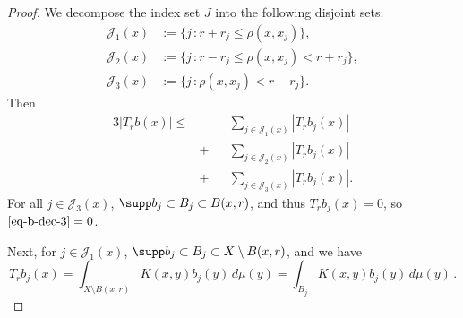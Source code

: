 \begin{proof}
We decompose the index set $J$ into the following disjoint sets:
\begin{align*}
    \mathcal{J}_1(x)&:=\{j\,: r+r_j \le \rho(x,x_j) \},\\
    \mathcal{J}_2(x)&:=\{j\,: r-r_j \le \rho(x,x_j) < r+r_j\},\\
    \mathcal{J}_3(x)&:=\{j\,: \rho(x,x_j) < r-r_j\}.
\end{align*}
Then
\begin{alignat}{3}
    \label{eq-b-dec-1}
    |T_r b(x)|\le&&&\sum_{j\in \mathcal{J}_1(x)} |T_rb_j(x)| \\
    \label{eq-b-dec-2}
                &+&&\sum_{j\in \mathcal{J}_2(x)} |T_rb_j(x)| \\
    \label{eq-b-dec-3}
                &+&&\sum_{j\in \mathcal{J}_3(x)} |T_rb_j(x)|.
\end{alignat}
For all $j\in \mathcal{J}_3(x)$, $\supp b_j\subset B_j\subset B(x,r)$, and thus $T_rb_j(x)=0$, so $\eqref{eq-b-dec-3} = 0$.

Next, for $j\in \mathcal{J}_1(x)$, $\supp b_j\subset B_j\subset X \setminus B(x,r)$, and we have
\begin{equation*}
    T_rb_j(x)=\int_{X\setminus B(x,r)} K(x,y) b_j(y)\,d\mu(y)=\int_{B_j} K(x,y) b_j(y)\,d\mu(y)\,.
\end{equation*}


\end{proof}
